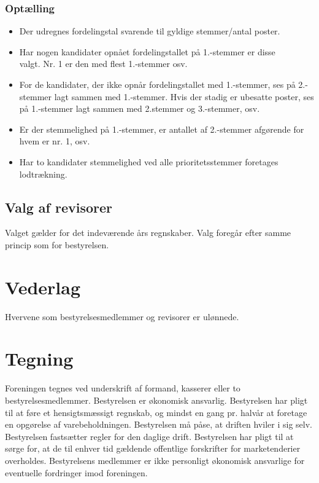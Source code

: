 \documentclass[a4paper, 10pt]{article}
\begin{document}
\subsubsection*{Optælling}

\begin{itemize}

\item Der udregnes fordelingstal svarende til gyldige stemmer/antal poster.

\item Har nogen kandidater opnået fordelingstallet på 1.-stemmer er disse
\\ valgt. Nr. 1 er den med flest 1.-stemmer osv.

\item For de kandidater, der ikke opnår fordelingstallet med
1.-stemmer, ses på 2.-stemmer lagt sammen med 1.-stemmer. Hvis der
stadig er ubesatte poster, ses på 1.-stemmer lagt sammen med 2.stemmer
og 3.-stemmer, osv.

\item Er der stemmelighed på 1.-stemmer, er antallet af 2.-stemmer
afgørende for hvem er nr.  1, osv.

\item Har to kandidater stemmelighed ved alle prioritetsstemmer
foretages \\ lodtrækning.

\end{itemize}

\subsection*{Valg af revisorer}

Valget gælder for det indeværende års regnskaber. Valg foregår efter
samme princip som for bestyrelsen.

\section{Vederlag}

Hvervene som bestyrelsesmedlemmer og revisorer er ulønnede.

\section{Tegning}

Foreningen tegnes ved underskrift af formand, kasserer eller to
bestyrelses\-medlemmer. Bestyrelsen er økonomisk ansvarlig.
Bestyrelsen har pligt til at føre et hensigtsmæssigt regnskab, og
mindst en gang pr. halvår at foretage en opgørelse af
varebeholdningen. Bestyrelsen må påse, at driften hviler i sig selv.
Bestyrelsen fastsætter regler for den daglige drift. Bestyrelsen har
pligt til at sørge for, at de til enhver tid gældende offentlige
forskrifter for marketenderier overholdes. Bestyrelsens medlemmer er
ikke personligt økonomisk ansvar\-lige for eventuelle fordringer imod
foreningen.
\end{document}
